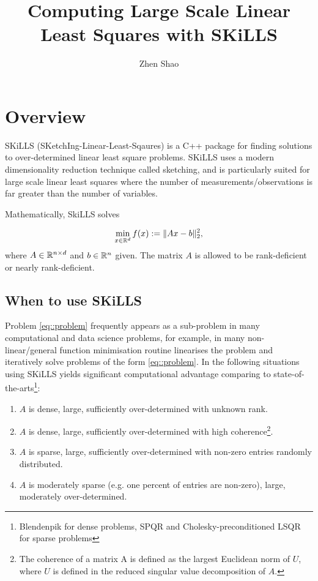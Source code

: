 \documentclass[english,11pt]{article}
\begin{document}
\title{Computing Large Scale Linear Least Squares with SKiLLS}

\author{Zhen Shao}\maketitle

\section{Overview}

SKiLLS (SKetchIng-Linear-Least-Sqaures) is a C++ package for finding solutions to over-determined linear least square problems. SKiLLS uses a modern dimensionality reduction technique called sketching, and is particularly suited for large scale linear least squares where the number of measurements/observations is far greater than the number of variables. 

Mathematically, SkiLLS solves

\begin{align}
\min_{x \in \mathbb{R}^{d}} f(x): = \|Ax - b\|_2^2, \label{eq::problem}
\end{align}
where $A \in \mathbb{R}^{n\times d}$ and $b \in \mathbb{R}^{n}$ given. The matrix $A$ is allowed to be rank-deficient or nearly rank-deficient. 

\subsection{When to use SKiLLS}

Problem \eqref{eq::problem} frequently appears as a sub-problem in many computational and data science problems, for example, in many non-linear/general function minimisation routine linearises the problem and iteratively solve problems of the form \eqref{eq::problem}. In the following situations using SKiLLS yields significant computational advantage comparing to state-of-the-arts\footnote{Blendenpik \cite{doi:10.1137/090767911} for dense problems, SPQR \cite{Davis:2011ft} and Cholesky-preconditioned LSQR \cite{Scott:2014iq} for sparse problems}:

\begin{enumerate}
	\item $A$ is dense, large, sufficiently over-determined with unknown rank. 

	\item $A$ is dense, large, sufficiently over-determined with high coherence\footnote{The coherence of a matrix A is defined as the largest Euclidean norm of $U$, where $U$ is defined in the reduced singular value decomposition of $A$. }.

	\item $A$ is sparse, large, sufficiently over-determined with non-zero entries randomly distributed. 

	\item $A$ is moderately sparse (e.g. one percent of entries are non-zero), large, moderately over-determined. 

\end{enumerate}
\end{document}
